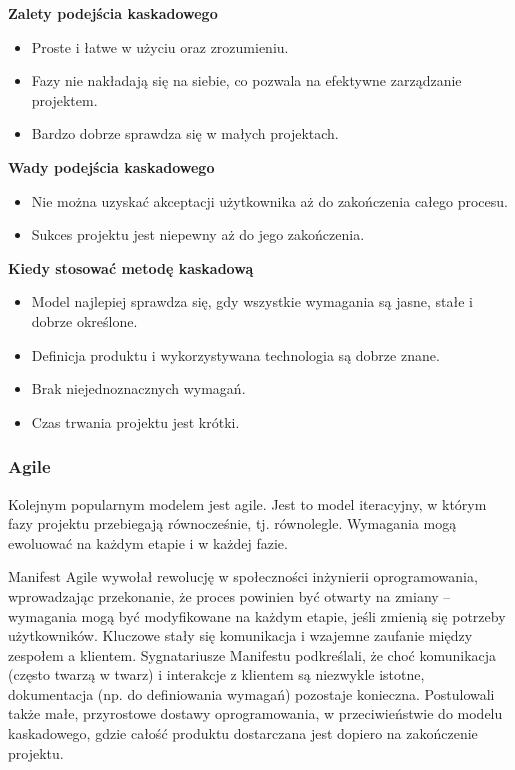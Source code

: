 \textbf{Zalety podejścia kaskadowego}
\begin{itemize}
    \item Proste i łatwe w użyciu oraz zrozumieniu.
    \item Fazy nie nakładają się na siebie, co pozwala na efektywne zarządzanie projektem.
    \item Bardzo dobrze sprawdza się w małych projektach.
\end{itemize}

\textbf{Wady podejścia kaskadowego}
\begin{itemize}
    \item Nie można uzyskać akceptacji użytkownika aż do zakończenia całego procesu.
    \item Sukces projektu jest niepewny aż do jego zakończenia.
\end{itemize}

\textbf{Kiedy stosować metodę kaskadową}
\begin{itemize}
    \item Model najlepiej sprawdza się, gdy wszystkie wymagania są jasne, stałe i dobrze określone.
    \item Definicja produktu i wykorzystywana technologia są dobrze znane.
    \item Brak niejednoznacznych wymagań.
    \item Czas trwania projektu jest krótki. \autocite{arora2016analysis}
\end{itemize}

\subsubsection{Agile}

Kolejnym popularnym modelem jest agile. Jest to model iteracyjny, w którym fazy projektu przebiegają równocześnie, tj. równolegle. Wymagania mogą ewoluować na każdym etapie i w każdej fazie. \autocite{arora2016analysis}

Manifest Agile \autocite{agileManifesto} wywołał rewolucję w społeczności inżynierii oprogramowania, wprowadzając przekonanie, że proces powinien być otwarty na zmiany – wymagania mogą być modyfikowane na każdym etapie, jeśli zmienią się potrzeby użytkowników. Kluczowe stały się komunikacja i wzajemne zaufanie między zespołem a klientem. Sygnatariusze Manifestu podkreślali, że choć komunikacja (często twarzą w twarz) i interakcje z klientem są niezwykle istotne, dokumentacja (np. do definiowania wymagań) pozostaje konieczna. Postulowali także małe, przyrostowe dostawy oprogramowania, w przeciwieństwie do modelu kaskadowego, gdzie całość produktu dostarczana jest dopiero na zakończenie projektu. \autocite{swebok}

